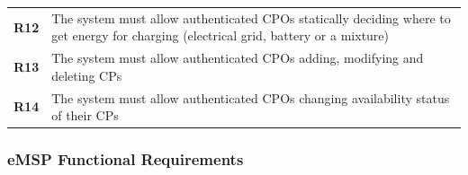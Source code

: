 \begin{table}[H]
\begin{tabularx}{\textwidth}{cX}
        \textbf{R12} & The system must allow authenticated CPOs statically deciding where to get energy for charging (electrical grid, battery or a mixture)                    \\
        \textbf{R13} & The system must allow authenticated CPOs adding, modifying and deleting CPs                                                                              \\
        \textbf{R14} & The system must allow authenticated CPOs changing availability status of their CPs                                                                       \\
        \bottomrule
    \end{tabularx}
\end{table}
\subsubsection{eMSP Functional Requirements}
